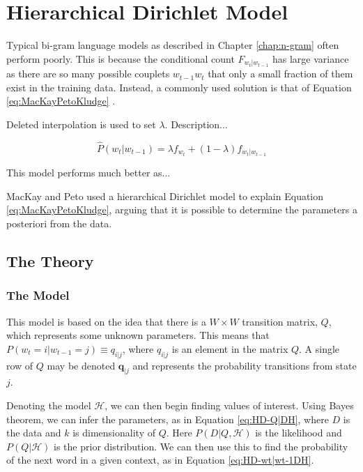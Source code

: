 \chapter{Hierarchical Dirichlet Model} \label{chap:HierarchicalDirichletModel}

Typical bi-gram language models as described in Chapter \ref{chap:n-gram} often perform poorly. This is because the conditional count $F_{w_{t}|w_{t-1}}$ has large variance as there are so many possible couplets $w_{t-1}w_{t}$ that only a small fraction of them exist in the training data. Instead, a commonly used solution is that of Equation \ref{eq:MacKayPetoKludge} \cite{mackay1995hierarchical}. 

Deleted interpolation \cite{jelinek1980interpolated} is used to set $\lambda$. Description...


\begin{equation}
\hat{P}(w_{t}|w_{t-1})=\lambda f_{w_{t}}+(1-\lambda)f_{w_{t}|w_{t-1}}
\label{eq:MacKayPetoKludge}
\end{equation}

This model performs much better as...


MacKay and Peto \cite{mackay1995hierarchical} used a hierarchical Dirichlet model to explain Equation \ref{eq:MacKayPetoKludge}, arguing that it is possible to determine the parameters a posteriori from the data.

\section{The Theory}

\subsection{The Model}

This model is based on the idea that there is a $W\times W$ transition matrix, $Q$, which represents some unknown parameters. This means that $P(w_{t}=i|w_{t-1}=j)\equiv q_{i|j}$, where $q_{i|j}$ is an element in the matrix $Q$. A single row of $Q$ may be denoted $\boldsymbol{q}_{|j}$ and represents the probability transitions from state $j$.

Denoting the model $\mathscr{H}$, we can then begin finding values of interest. Using Bayes theorem, we can infer the parameters, as in Equation \ref{eq:HD-Q|DH}, where $D$ is the data and $k$ is dimensionality of $Q$. Here $P(D|Q,\mathscr{H})$ is the likelihood and $P(Q|\mathscr{H})$ is the prior distribution. We can then use this to find the probability of the next word in a given context, as in Equation \ref{eq:HD-wt|wt-1DH}.


